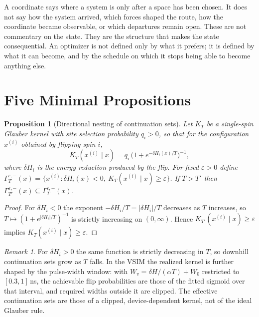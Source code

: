 \documentclass[11pt]{article}
\newtheorem{proposition}{Proposition}
\theoremstyle{definition}
\theoremstyle{remark}
\newtheorem*{remark}{Remark}
\begin{document}
A coordinate says where a system is only after a space has been chosen. It does not say how the system arrived, which forces shaped the route, how the coordinate became observable, or which departures remain open. These are not commentary on the state. They are the structure that makes the state consequential. An optimizer is not defined only by what it prefers; it is defined by what it can become, and by the schedule on which it stops being able to become anything else.

\appendix
\section{Five Minimal Propositions}

\begin{proposition}[Directional nesting of continuation sets]\label{prop:nest}
Let $K_T$ be a single-spin Glauber kernel with site selection probability $q_i > 0$, so that for the configuration $x^{(i)}$ obtained by flipping spin $i$,
\[
K_T(x^{(i)} \mid x) = q_i \,\big(1 + e^{-\delta H_i(x)/T}\big)^{-1},
\]
where $\delta H_i$ is the energy reduction produced by the flip. For fixed $\varepsilon > 0$ define $\Gamma_T^{\varepsilon,-}(x) = \{ x^{(i)} : \delta H_i(x) < 0,\ K_T(x^{(i)} \mid x) \geq \varepsilon \}$. If $T > T'$ then $\Gamma_{T'}^{\varepsilon,-}(x) \subseteq \Gamma_T^{\varepsilon,-}(x)$.
\end{proposition}
\begin{proof}
For $\delta H_i < 0$ the exponent $-\delta H_i / T = |\delta H_i|/T$ decreases as $T$ increases, so $T \mapsto (1 + e^{|\delta H_i|/T})^{-1}$ is strictly increasing on $(0,\infty)$. Hence $K_{T'}(x^{(i)} \mid x) \geq \varepsilon$ implies $K_T(x^{(i)} \mid x) \geq \varepsilon$.
\end{proof}
\begin{remark}
For $\delta H_i > 0$ the same function is strictly decreasing in $T$, so downhill continuation sets grow as $T$ falls. In the VSIM the realized kernel is further shaped by the pulse-width window: with $W_v = \delta H/(\alpha T) + W_0$ restricted to $[0.3, 1]$\,ns, the achievable flip probabilities are those of the fitted sigmoid over that interval, and required widths outside it are clipped. The effective continuation sets are those of a clipped, device-dependent kernel, not of the ideal Glauber rule.
\end{remark}
\end{document}

